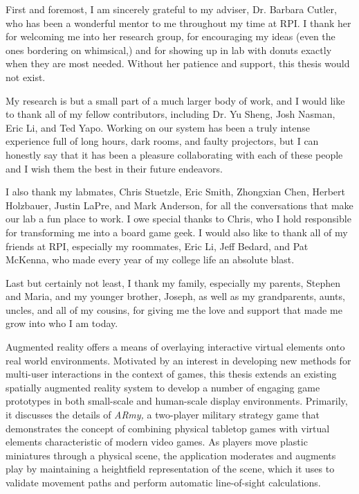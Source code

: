 \documentclass{thesis}
\author{Andrew Dolce}
\begin{document}
 
\titlepage             %
\tableofcontents       %
\listoffigures         %


First and foremost, I am sincerely grateful to my adviser, Dr. Barbara Cutler, who has been a wonderful mentor to me throughout my time at RPI. I thank her for welcoming me into her research group, for encouraging my ideas (even the ones bordering on whimsical,) and for showing up in lab with donuts exactly when they are most needed. Without her patience and support, this thesis would not exist.

My research is but a small part of a much larger body of work, and I would like to thank all of my fellow contributors, including Dr. Yu Sheng, Josh Nasman, Eric Li, and Ted Yapo. Working on our system has been a truly intense experience full of long hours, dark rooms, and faulty projectors, but I can honestly say that it has been a pleasure collaborating with each of these people and I wish them the best in their future endeavors.

I also thank my labmates, Chris Stuetzle, Eric Smith, Zhongxian Chen, Herbert Holzbauer, Justin LaPre, and Mark Anderson, for all the conversations that make our lab a fun place to work. I owe special thanks to Chris, who I hold responsible for transforming me into a board game geek. I would also like to thank all of my friends at RPI, especially my roommates, Eric Li, Jeff Bedard, and Pat McKenna, who made every year of my college life an absolute blast.

Last but certainly not least, I thank my family, especially my parents, Stephen and Maria, and my younger brother, Joseph, as well as my grandparents, aunts, uncles, and all of my cousins, for giving me the love and support that made me grow into who I am today.

Augmented reality offers a means of overlaying interactive virtual elements onto real world environments. Motivated by an interest in developing new methods for multi-user interactions in the context of games, this thesis extends an existing spatially augmented reality system to develop a number of engaging game prototypes in both small-scale and human-scale display environments. Primarily, it discusses the details of \emph{ARmy,} a two-player military strategy game that demonstrates the concept of combining physical tabletop games with virtual elements characteristic of modern video games. As players move plastic miniatures through a physical scene, the application moderates and augments play by maintaining a heightfield representation of the scene, which it uses to validate movement paths and perform automatic line-of-sight calculations. 
\end{document}
